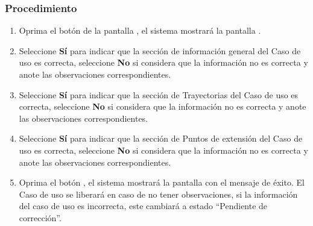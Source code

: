 \subsubsection{Procedimiento}
\begin{enumerate}
	\item Oprima el botón \btnLiberar de la pantalla , el sistema mostrará la pantalla . 

	 
	\item Seleccione \textbf{Sí} para indicar que la sección de información general del Caso de uso es correcta, seleccione \textbf{No} si considera que la información no es correcta y anote las observaciones correspondientes.
	
	\item Seleccione \textbf{Sí} para indicar que la sección de Trayectorias del Caso de uso es correcta, seleccione \textbf{No} si considera que la información no es correcta y anote las observaciones correspondientes.
	
	\item Seleccione \textbf{Sí} para indicar que la sección de Puntos de extensión del Caso de uso es correcta, seleccione \textbf{No} si considera que la información no es correcta y anote las observaciones correspondientes.
	
	\item Oprima el botón , el sistema mostrará la pantalla  con el mensaje de éxito. El Caso de uso se liberará 
	en caso de no tener observaciones, si la información del caso de uso es incorrecta, este cambiará a estado ``Pendiente de corrección''.
\end{enumerate}


